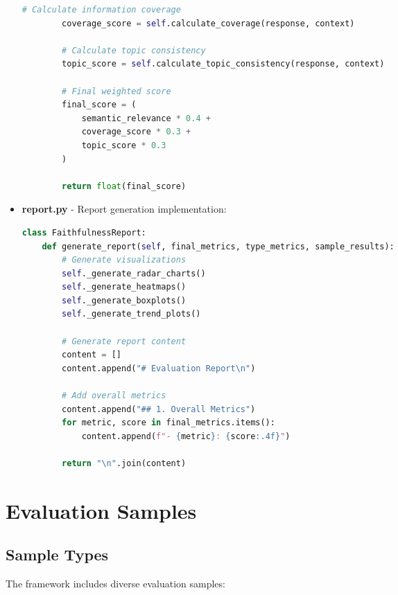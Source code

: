 \begin{itemize}
\begin{lstlisting}[language=Python, breaklines=true, basicstyle=\ttfamily\scriptsize]
        # Calculate information coverage
        coverage_score = self.calculate_coverage(response, context)
        
        # Calculate topic consistency
        topic_score = self.calculate_topic_consistency(response, context)
        
        # Final weighted score
        final_score = (
            semantic_relevance * 0.4 +
            coverage_score * 0.3 +
            topic_score * 0.3
        )
        
        return float(final_score)
    \end{lstlisting}

    \item \textbf{report.py} - Report generation implementation:
    \begin{lstlisting}[language=Python, breaklines=true, basicstyle=\ttfamily\scriptsize]
class FaithfulnessReport:
    def generate_report(self, final_metrics, type_metrics, sample_results):
        # Generate visualizations
        self._generate_radar_charts()
        self._generate_heatmaps()
        self._generate_boxplots()
        self._generate_trend_plots()
        
        # Generate report content
        content = []
        content.append("# Evaluation Report\n")
        
        # Add overall metrics
        content.append("## 1. Overall Metrics")
        for metric, score in final_metrics.items():
            content.append(f"- {metric}: {score:.4f}")
        
        return "\n".join(content)
    \end{lstlisting}
\end{itemize}

\section{Evaluation Samples}

\subsection{Sample Types}
The framework includes diverse evaluation samples:

